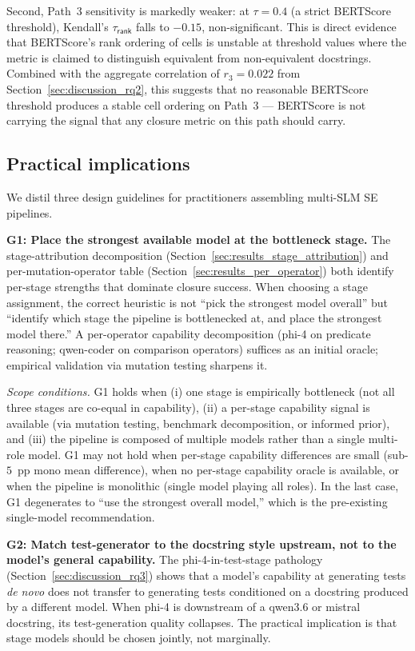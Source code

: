 Second, Path~3 sensitivity is markedly weaker: at $\tau = 0.4$ (a strict BERTScore threshold), Kendall's $\tau_{\textsf{rank}}$ falls to $-0.15$, non-significant. This is direct evidence that BERTScore's rank ordering of cells is unstable at threshold values where the metric is claimed to distinguish equivalent from non-equivalent docstrings. Combined with the aggregate correlation of $r_3 = 0.022$ from Section~\ref{sec:discussion_rq2}, this suggests that no reasonable BERTScore threshold produces a stable cell ordering on Path~3 --- BERTScore is not carrying the signal that any closure metric on this path should carry.

\subsection{Practical implications}
\label{sec:discussion_practical}

We distil three design guidelines for practitioners assembling multi-SLM SE pipelines.

\textbf{G1: Place the strongest available model at the bottleneck stage.} The stage-attribution decomposition (Section~\ref{sec:results_stage_attribution}) and per-mutation-operator table (Section~\ref{sec:results_per_operator}) both identify per-stage strengths that dominate closure success. When choosing a stage assignment, the correct heuristic is not ``pick the strongest model overall'' but ``identify which stage the pipeline is bottlenecked at, and place the strongest model there.'' A per-operator capability decomposition (phi-4 on predicate reasoning; qwen-coder on comparison operators) suffices as an initial oracle; empirical validation via mutation testing sharpens it.

\emph{Scope conditions.} G1 holds when (i) one stage is empirically bottleneck (not all three stages are co-equal in capability), (ii) a per-stage capability signal is available (via mutation testing, benchmark decomposition, or informed prior), and (iii) the pipeline is composed of multiple models rather than a single multi-role model. G1 may not hold when per-stage capability differences are small (sub-$5$~pp mono mean difference), when no per-stage capability oracle is available, or when the pipeline is monolithic (single model playing all roles). In the last case, G1 degenerates to ``use the strongest overall model,'' which is the pre-existing single-model recommendation.

\textbf{G2: Match test-generator to the docstring style upstream, not to the model's general capability.} The phi-4-in-test-stage pathology (Section~\ref{sec:discussion_rq3}) shows that a model's capability at generating tests \emph{de novo} does not transfer to generating tests conditioned on a docstring produced by a different model. When phi-4 is downstream of a qwen3.6 or mistral docstring, its test-generation quality collapses. The practical implication is that stage models should be chosen jointly, not marginally.

